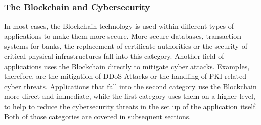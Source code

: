 \subsubsection{The Blockchain and Cybersecurity}
In most cases, the Blockchain technology is used within different types of applications to make them more secure. More secure databases, transaction systems for banks, the replacement of certificate authorities or the security of critical physical infrastructures fall into this category. Another field of applications uses the Blockchain directly to mitigate cyber attacks. Examples, therefore, are the mitigation of DDoS Attacks or the handling of PKI related cyber threats. Applications that fall into the second category use the Blockchain more direct and immediate, while the first category uses them on a higher level, to help to reduce the cybersecurity threats in the set up of the application itself. Both of those categories are covered in subsequent sections.
